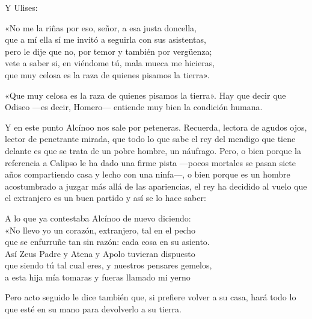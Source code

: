 Y Ulises:

\begin{versocita}
«No me la riñas por eso, señor, a esa justa doncella,\\
que a mí ella sí me invitó a seguirla con sus asistentas,\\
pero le dije que no, por temor y también por vergüenza;\\
vete a saber si, en viéndome tú, mala mueca me hicieras,\\
que muy celosa es la raza de quienes pisamos la tierra».
\end{versocita}

«Que muy celosa es la raza de quienes pisamos la tierra». Hay que decir que Odiseo ---es decir, Homero--- entiende muy bien la condición humana.

Y en este punto Alcínoo nos sale por peteneras. Recuerda, lectora de agudos ojos, lector de penetrante mirada, que todo lo que sabe el rey del mendigo que tiene delante es que se trata de un pobre hombre, un náufrago. Pero, o bien porque la referencia a Calipso le ha dado una firme pista ---pocos mortales se pasan siete años compartiendo casa y lecho con una ninfa---, o bien porque es un hombre acostumbrado a juzgar más allá de las apariencias, el rey ha decidido al vuelo que el extranjero es un buen partido y así se lo hace saber:

\begin{versocita}
A lo que ya contestaba Alcínoo de nuevo diciendo:\\
«No llevo yo un corazón, extranjero, tal en el pecho\\
que se enfurruñe tan sin razón: cada cosa en su asiento.\\
Así Zeus Padre y Atena y Apolo tuvieran dispuesto\\
que siendo tú tal cual eres, y nuestros pensares gemelos,\\
a esta hija mía tomaras y fueras llamado mi yerno
\end{versocita}

Pero acto seguido le dice también que, si prefiere volver a su casa, hará todo lo que esté en su mano para devolverlo a su tierra.

